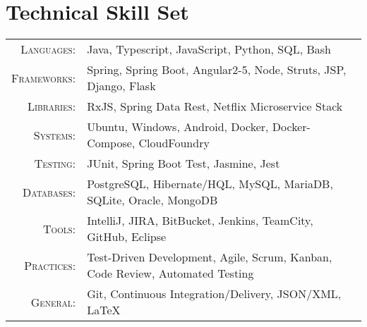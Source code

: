 \section{Technical Skill Set}\label{sec:technical-skill-set}
\begin{tabular}{r|p{11cm}}
    \textsc{Languages}: & Java, Typescript, JavaScript, Python, SQL, Bash \\
    \textsc{Frameworks}: & Spring, Spring Boot, Angular2-5, Node, Struts, JSP, Django, Flask \\
    \textsc{Libraries}: & RxJS, Spring Data Rest, Netflix Microservice Stack \\
    \textsc{Systems}: & Ubuntu, Windows, Android, Docker, Docker-Compose, CloudFoundry \\
    \textsc{Testing}: & JUnit, Spring Boot Test, Jasmine, Jest \\
    \textsc{Databases}: & PostgreSQL, Hibernate/HQL, MySQL, MariaDB, SQLite, Oracle, MongoDB \\
    \textsc{Tools}: & IntelliJ, JIRA, BitBucket, Jenkins, TeamCity, GitHub, Eclipse \\
    \textsc{Practices}: & Test-Driven Development, Agile, Scrum, Kanban, Code Review, Automated Testing \\
    \textsc{General}: & Git, Continuous Integration/Delivery, JSON/XML, LaTeX  \\
\end{tabular}